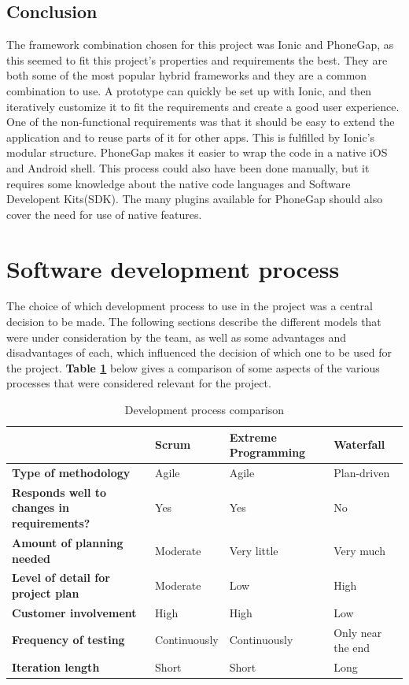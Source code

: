 \subsection{Conclusion}

The framework combination chosen for this project was Ionic and PhoneGap, as this seemed to fit this project's properties and requirements the best. They are both some of the most popular hybrid frameworks and they are a common combination to use. A prototype can quickly be set up with Ionic, and then iteratively customize it to fit the requirements and create a good user experience. One of the non-functional requirements was that it should be easy to extend the application and to reuse parts of it for other apps. This is fulfilled by Ionic's modular structure. PhoneGap makes it easier to wrap the code in a native iOS and Android shell. This process could also have been done manually, but it requires some knowledge about the native code languages and Software Developent Kits(SDK). The many plugins available for PhoneGap should also cover the need for use of native features.

\section{Software development process}

The choice of which development process to use in the project was a central decision to be made. The following sections describe the different models that were under consideration by the team, as well as some advantages and disadvantages of each, which influenced the decision of which one to be used for the project. \textbf{Table \ref{Tab:dev-process}} below gives a comparison of some aspects of the various processes that were considered relevant for the project.

\begin{table}[!h]
	\caption{Development process comparison}
	\small
	\begin{adjustbox}{center}
		\begin{tabular}{ | l | l | l | l |}
			\hline
			\textbf{} & \textbf{Scrum} & \textbf{Extreme Programming} & \textbf{Waterfall} \\ \hline
			\textbf{Type of methodology} & Agile & Agile & Plan-driven \\ \hline
			\textbf{Responds well to changes in requirements?} & Yes & Yes & No \\ \hline
			\textbf{Amount of planning needed} & Moderate & Very little & Very much \\ \hline
			\textbf{Level of detail for project plan} & Moderate & Low & High \\ \hline
			\textbf{Customer involvement} & High & High & Low \\ \hline
			\textbf{Frequency of testing} & Continuously & Continuously & Only near the end \\ \hline
			\textbf{Iteration length} & Short & Short & Long \\ \hline
		\end{tabular}
	\end{adjustbox}
	\label{Tab:dev-process}	
\end{table}


